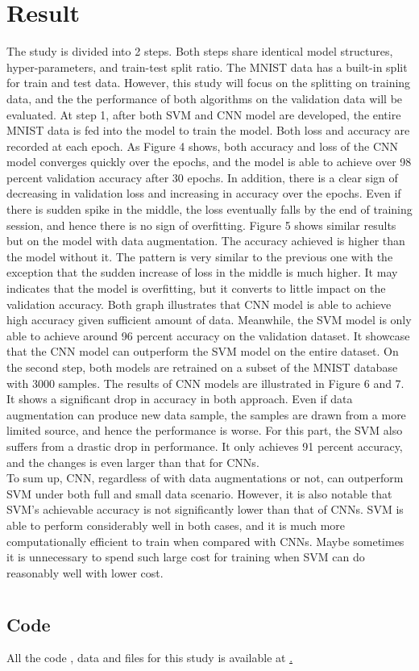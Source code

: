 \documentclass[letterpaper]{article} %
\begin{document}
\section{Result}
The study is divided into 2 steps. Both steps share identical model structures, hyper-parameters, and train-test split ratio. The MNIST data has a built-in split for train and test data. However, this study will focus on the splitting on training data, and the the performance of both algorithms on the validation data will be evaluated. At step 1, after both SVM and CNN model are developed, the entire MNIST data is fed into the model to train the model. Both loss and accuracy are recorded at each epoch.
As Figure 4 shows, both accuracy and loss of the CNN model converges quickly over the epochs, and the model is able to achieve over 98 percent validation accuracy after 30 epochs. In addition, there is a clear sign of decreasing in validation loss and increasing in accuracy over the epochs. Even if there is sudden spike in the middle, the loss eventually falls by the end of training session, and hence there is no sign of overfitting. 
Figure 5 shows similar results but on the model with data augmentation. The accuracy achieved is higher than the model without it. The pattern is very similar to the previous one with the exception that the sudden increase of loss in the middle is much higher. It may indicates that the model is overfitting, but it converts to little impact on the validation accuracy. Both graph illustrates that CNN model is able to achieve high accuracy given sufficient amount of data. Meanwhile, the SVM model is only able to achieve around 96 percent accuracy on the validation dataset. It showcase that the CNN model can outperform the SVM model on the entire dataset. On the second step, both models are retrained on a subset of the MNIST database with 3000 samples. The results of CNN models are illustrated in Figure 6 and 7. It shows a significant drop in accuracy in both approach. Even if data augmentation can produce new data sample, the samples are drawn from a more limited source, and hence the performance is worse. For this part, the SVM also suffers from a drastic drop in performance. It only achieves 91 percent accuracy, and the changes is even larger than that for CNNs. \\
To sum up, CNN, regardless of with data augmentations or not, can outperform SVM under both full and small data scenario. However, it is also notable that SVM's achievable accuracy is not significantly lower than that of CNNs. SVM is able to perform considerably well in both cases, and it is much more computationally efficient to train when compared with CNNs. Maybe sometimes it is unnecessary to spend such large cost for training when SVM can do reasonably well with lower cost.
\\
\newpage

\section{}
\mbox{}
\nocite{*}



\subsection{Code}
All the code , data and files for this study is available at  \href{https://github.com/QinHE325/BioStats823FinalProject}.
\end{document}
